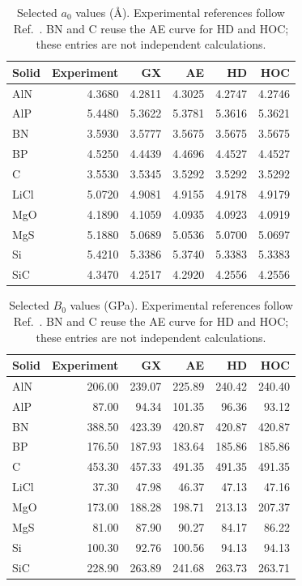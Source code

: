 \begin{table}[t]
\centering
\small
\caption{Selected $a_0$ values (\AA{}). Experimental references follow Ref.~. BN and C reuse the AE curve for HD and HOC; these entries are not independent calculations.}
\label{tab:selected-a0_A}
\begin{tabular}{lrrrrr}
\toprule
Solid & Experiment & GX & AE & HD & HOC \\
\midrule
AlN & 4.3680 & 4.2811 & 4.3025 & 4.2747 & 4.2746 \\
AlP & 5.4480 & 5.3622 & 5.3781 & 5.3616 & 5.3621 \\
BN & 3.5930 & 3.5777 & 3.5675 & 3.5675 & 3.5675 \\
BP & 4.5250 & 4.4439 & 4.4696 & 4.4527 & 4.4527 \\
C & 3.5530 & 3.5345 & 3.5292 & 3.5292 & 3.5292 \\
LiCl & 5.0720 & 4.9081 & 4.9155 & 4.9178 & 4.9179 \\
MgO & 4.1890 & 4.1059 & 4.0935 & 4.0923 & 4.0919 \\
MgS & 5.1880 & 5.0689 & 5.0536 & 5.0700 & 5.0697 \\
Si & 5.4210 & 5.3386 & 5.3740 & 5.3383 & 5.3383 \\
SiC & 4.3470 & 4.2517 & 4.2920 & 4.2556 & 4.2556 \\
\bottomrule
\end{tabular}
\end{table}

\begin{table}[t]
\centering
\small
\caption{Selected $B_0$ values (GPa). Experimental references follow Ref.~. BN and C reuse the AE curve for HD and HOC; these entries are not independent calculations.}
\label{tab:selected-B0_GPa}
\begin{tabular}{lrrrrr}
\toprule
Solid & Experiment & GX & AE & HD & HOC \\
\midrule
AlN & 206.00 & 239.07 & 225.89 & 240.42 & 240.40 \\
AlP & 87.00 & 94.34 & 101.35 & 96.36 & 93.12 \\
BN & 388.50 & 423.39 & 420.87 & 420.87 & 420.87 \\
BP & 176.50 & 187.93 & 183.64 & 185.86 & 185.86 \\
C & 453.30 & 457.33 & 491.35 & 491.35 & 491.35 \\
LiCl & 37.30 & 47.98 & 46.37 & 47.13 & 47.16 \\
MgO & 173.00 & 188.28 & 198.71 & 213.13 & 207.37 \\
MgS & 81.00 & 87.90 & 90.27 & 84.17 & 86.22 \\
Si & 100.30 & 92.76 & 100.56 & 94.13 & 94.13 \\
SiC & 228.90 & 263.89 & 241.68 & 263.73 & 263.71 \\
\bottomrule
\end{tabular}
\end{table}


